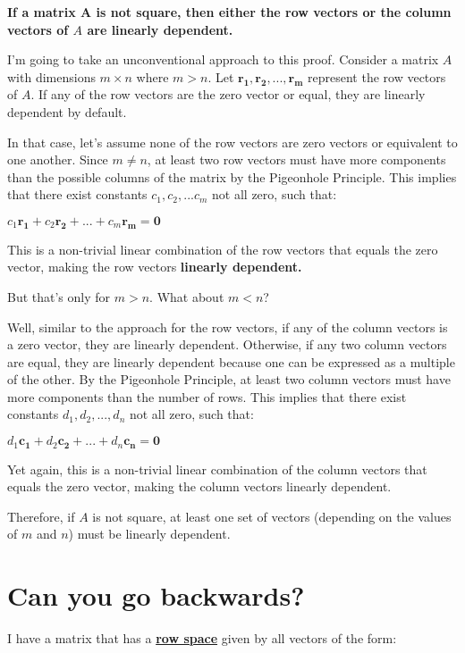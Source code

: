 \documentclass[
  letterpaper,
  DIV=11,
  numbers=noendperiod]{scrartcl}
\begin{document}
\textbf{If a matrix \(\symbf{A}\) is not square, then either the row
vectors or the column vectors of \(A\) are linearly dependent.}

I'm going to take an unconventional approach to this proof. Consider a
matrix \(A\) with dimensions \(m \times n\) where \(m > n\). Let
\(\symbf{r_1, r_2, ..., r_m}\) represent the row vectors of \(A\). If
any of the row vectors are the zero vector or equal, they are linearly
dependent by default.

In that case, let's assume none of the row vectors are zero vectors or
equivalent to one another. Since \(m \ne n\), at least two row vectors
must have more components than the possible columns of the matrix by the
Pigeonhole Principle. This implies that there exist constants
\(c_1, c_2, ... c_m\) not all zero, such that:

\(c_1\symbf{r_1}+c_2\symbf{r_2}+ ... + c_m\symbf{r_m} = \symbf{0}\)

This is a non-trivial linear combination of the row vectors that equals
the zero vector, making the row vectors \textbf{linearly dependent.}

But that's only for \(m > n\). What about \(m < n\)?

Well, similar to the approach for the row vectors, if any of the column
vectors is a zero vector, they are linearly dependent. Otherwise, if any
two column vectors are equal, they are linearly dependent because one
can be expressed as a multiple of the other. By the Pigeonhole
Principle, at least two column vectors must have more components than
the number of rows. This implies that there exist constants
\(d_1, d_2, ..., d_n\) not all zero, such that:

\(d_1\symbf{c_1}+d_2\symbf{c_2}+ ... +d_n\symbf{c_n} = \symbf{0}\)

Yet again, this is a non-trivial linear combination of the column
vectors that equals the zero vector, making the column vectors linearly
dependent.

Therefore, if \(A\) is not square, at least one set of vectors
(depending on the values of \(m\) and \(n\)) must be linearly dependent.

\newpage{}

\hypertarget{can-you-go-backwards}{%
\section{Can you go backwards?}\label{can-you-go-backwards}}

I have a matrix that has a \ul{\textbf{row space}} given by all vectors
of the form:
\end{document}
